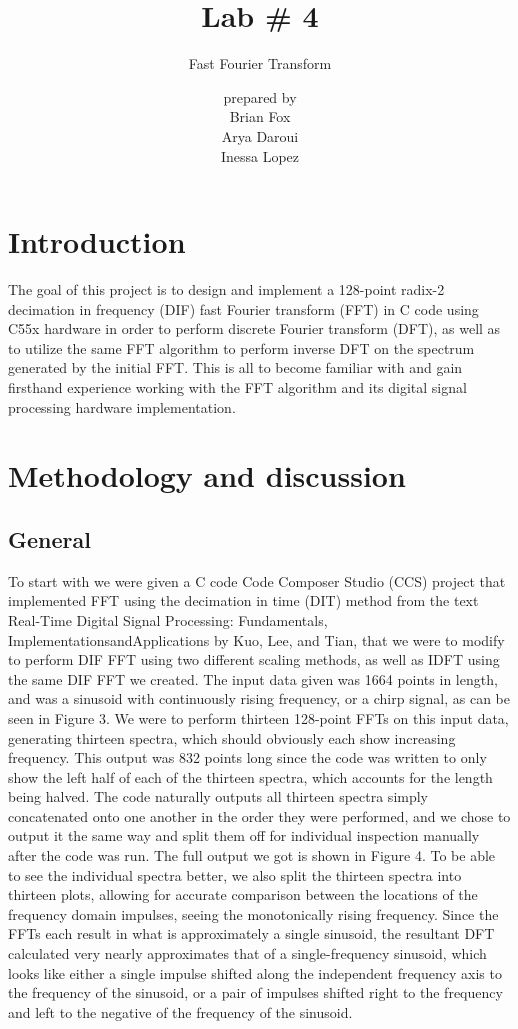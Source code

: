 \documentclass{bannerReport}
\title{Lab \# 4}
\subtitle{Fast Fourier Transform}
\author{ {\small prepared by} \\ Brian Fox \\Arya Daroui \\ Inessa Lopez}
\begin{document}
 \sloppy

\section{Introduction}
The goal of this project is to design and implement a 128-point radix-2 decimation in frequency (DIF) fast Fourier transform (FFT) in C code using C55x hardware in order to perform discrete Fourier transform (DFT), as well as to utilize the same FFT algorithm to perform inverse DFT on the spectrum generated by the initial FFT. This is all to become familiar with and gain firsthand experience working with the FFT algorithm and its digital signal processing hardware implementation. 

\section{Methodology and discussion}

\subsection{General}
To start with we were given a C code Code Composer Studio (CCS) project that implemented FFT using the decimation in time (DIT) method from the text Real-Time Digital Signal Processing: Fundamentals, ImplementationsandApplications by Kuo, Lee, and Tian, that we were to modify to perform DIF FFT using two different scaling methods, as well as IDFT using the same DIF FFT we created. The input data given was 1664 points in length, and was a sinusoid with continuously rising frequency, or a chirp signal, as can be seen in Figure 3. We were to perform thirteen 128-point FFTs on this input data, generating thirteen spectra, which should obviously each show increasing frequency. This output was 832 points long since the code was written to only show the left half of each of the thirteen spectra, which accounts for the length being halved. The code naturally outputs all thirteen spectra simply concatenated onto one another in the order they were performed, and we chose to output it the same way and split them off for individual inspection manually after the code was run. The full output we got is shown in Figure 4. To be able to see the individual spectra better, we also split the thirteen spectra into thirteen plots, allowing for accurate comparison between the locations of the frequency domain impulses, seeing the monotonically rising frequency. Since the FFTs each result in what is approximately a single sinusoid, the resultant DFT calculated very nearly approximates that of a single-frequency sinusoid, which looks like either a single impulse shifted along the independent frequency axis to the frequency of the sinusoid, or a pair of impulses shifted right to the frequency and left to the negative of the frequency of the sinusoid. 
\end{document}
